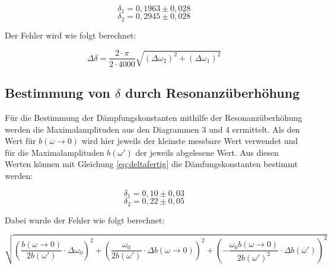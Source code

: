 \[\boxed{\delta_1 = 0,1963 \pm 0,028}\]
\[\boxed{\delta_2 = 0,2945 \pm 0,028}\]

Der Fehler wird wie folgt berechnet:

\begin{equation}
    \Delta \delta = \frac{2 \cdot \pi}{2 \cdot 4000}\sqrt{(\Delta\omega_2)^2+ (\Delta\omega_1)^2}
\end{equation}

\subsection{Bestimmung von $\delta$ durch Resonanzüberhöhung}

Für die Bestimmung der Dämpfungskonstanten mithilfe der Resonanzüberhöhung werden die Maximalamplituden aus den Diagrammen 3 und 4 errmittelt.
Als den Wert für $b(\omega \rightarrow 0)$ wird hier jeweils der kleinste messbare Wert verwendet und für die Maximalamplituden $b(\omega')$ der jeweils abgelesene Wert.
Aus diesen Werten können mit Gleichung \ref{eq:deltafertig} die Dämfungskonstanten bestimmt werden:

\[\boxed{\delta_1 = 0,10 \pm 0,03}\]
\[\boxed{\delta_2 = 0,22 \pm 0,05}\]

Dabei wurde der Fehler wie folgt berechnet:

\begin{equation}
    \sqrt{
\left( \frac{b(\omega \to 0)}{2 b(\omega')} \cdot \Delta \omega_0 \right)^2
+ \left( \frac{\omega_0}{2 b(\omega')} \cdot \Delta b(\omega \to 0) \right)^2
+ \left( - \frac{\omega_0 b(\omega \to 0)}{2 b(\omega')^2} \cdot \Delta b(\omega') \right)^2
}
\end{equation}
